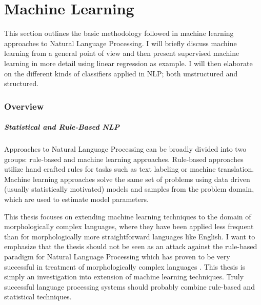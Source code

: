 \chapter{Machine Learning}
\label{chap:ml}

This section outlines the basic methodology followed in machine
learning approaches to Natural Language Processing. I will briefly
discuss machine learning from a general point of view and then present
supervised machine learning in more detail using linear regression as
example. I will then elaborate on the different kinds of classifiers
applied in NLP; both unstructured and structured.

\subsection{Overview}

\paragraph{Statistical and Rule-Based NLP}
Approaches to Natural Language Processing can be broadly divided into
two groups: rule-based and machine learning approaches. Rule-based
approaches utilize hand crafted rules for tasks such as text labeling
or machine translation. Machine learning approaches solve the same set
of problems using data driven (usually statistically motivated) models
and samples from the problem domain, which are used to estimate model
parameters.

This thesis focuses on extending machine learning techniques to the
domain of morphologically complex languages, where they have been
applied less frequent than for morphologically more straightforward
languages like English. I want to emphasize that the thesis should not
be seen as an attack against the rule-based paradigm for Natural
Language Processing which has proven to be very successful in
treatment of morphologically complex languages \cite{}. This thesis is
simply an investigation into extension of machine learning
techniques. Truly successful language processing systems should
probably combine rule-based and statistical techniques.

